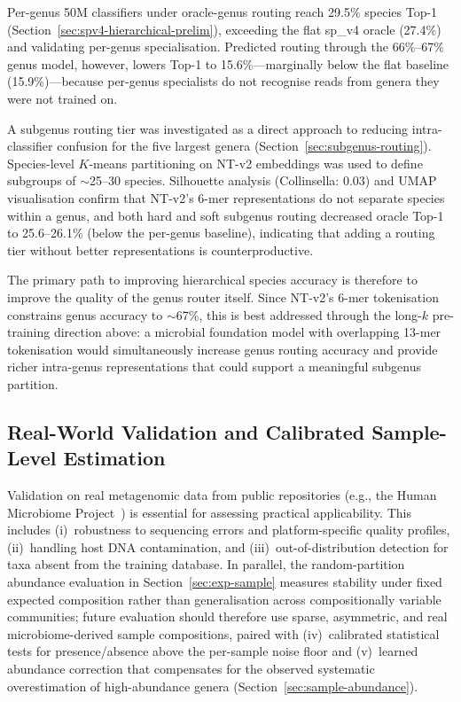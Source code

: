 Per-genus 50M classifiers under oracle-genus routing reach 29.5\% species Top-1 (Section~\ref{sec:spv4-hierarchical-prelim}), exceeding the flat sp\_v4 oracle (27.4\%) and validating per-genus specialisation. Predicted routing through the 66\%--67\% genus model, however, lowers Top-1 to 15.6\%---marginally below the flat baseline (15.9\%)---because per-genus specialists do not recognise reads from genera they were not trained on.

A subgenus routing tier was investigated as a direct approach to reducing intra-classifier confusion for the five largest genera (Section~\ref{sec:subgenus-routing}). Species-level $K$-means partitioning on NT-v2 embeddings was used to define subgroups of $\sim$25--30 species. Silhouette analysis (Collinsella: 0.03) and UMAP visualisation confirm that NT-v2's 6-mer representations do not separate species within a genus, and both hard and soft subgenus routing decreased oracle Top-1 to 25.6--26.1\% (below the per-genus baseline), indicating that adding a routing tier without better representations is counterproductive.

The primary path to improving hierarchical species accuracy is therefore to improve the quality of the genus router itself. Since NT-v2's 6-mer tokenisation constrains genus accuracy to $\sim$67\%, this is best addressed through the long-$k$ pre-training direction above: a microbial foundation model with overlapping 13-mer tokenisation would simultaneously increase genus routing accuracy and provide richer intra-genus representations that could support a meaningful subgenus partition.

\subsection{Real-World Validation and Calibrated Sample-Level Estimation}

Validation on real metagenomic data from public repositories (e.g., the Human Microbiome Project~\cite{HMP2012}) is essential for assessing practical applicability. This includes (i)~robustness to sequencing errors and platform-specific quality profiles, (ii)~handling host DNA contamination, and (iii)~out-of-distribution detection for taxa absent from the training database. In parallel, the random-partition abundance evaluation in Section~\ref{sec:exp-sample} measures stability under fixed expected composition rather than generalisation across compositionally variable communities; future evaluation should therefore use sparse, asymmetric, and real microbiome-derived sample compositions, paired with (iv)~calibrated statistical tests for presence/absence above the per-sample noise floor and (v)~learned abundance correction that compensates for the observed systematic overestimation of high-abundance genera (Section~\ref{sec:sample-abundance}).

